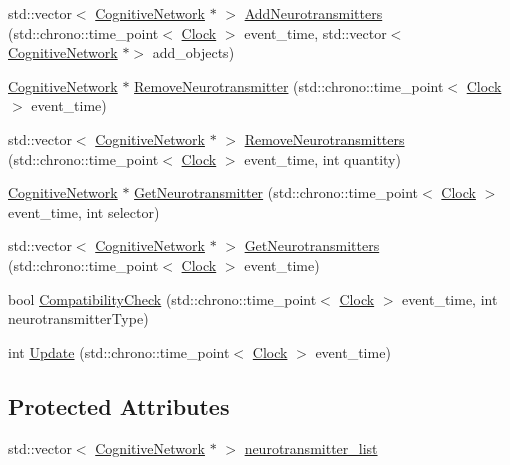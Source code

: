 \begin{DoxyCompactItemize}
\item 
std\+::vector$<$ \hyperlink{class_cognitive_network}{Cognitive\+Network} $\ast$ $>$ \hyperlink{class_membrane_channel_a01fb5f3176cfa3423bb10a04bf69da01}{Add\+Neurotransmitters} (std\+::chrono\+::time\+\_\+point$<$ \hyperlink{universe_8h_a0ef8d951d1ca5ab3cfaf7ab4c7a6fd80}{Clock} $>$ event\+\_\+time, std\+::vector$<$ \hyperlink{class_cognitive_network}{Cognitive\+Network} $\ast$$>$ add\+\_\+objects)
\item 
\hyperlink{class_cognitive_network}{Cognitive\+Network} $\ast$ \hyperlink{class_membrane_channel_a2252f222f4a41bf1975dc856569e0a22}{Remove\+Neurotransmitter} (std\+::chrono\+::time\+\_\+point$<$ \hyperlink{universe_8h_a0ef8d951d1ca5ab3cfaf7ab4c7a6fd80}{Clock} $>$ event\+\_\+time)
\item 
std\+::vector$<$ \hyperlink{class_cognitive_network}{Cognitive\+Network} $\ast$ $>$ \hyperlink{class_membrane_channel_a37f22ddd877e3be7b353048149a7bbcd}{Remove\+Neurotransmitters} (std\+::chrono\+::time\+\_\+point$<$ \hyperlink{universe_8h_a0ef8d951d1ca5ab3cfaf7ab4c7a6fd80}{Clock} $>$ event\+\_\+time, int quantity)
\item 
\hyperlink{class_cognitive_network}{Cognitive\+Network} $\ast$ \hyperlink{class_membrane_channel_a91ce6506a8e82905de7cd031ed5d63f5}{Get\+Neurotransmitter} (std\+::chrono\+::time\+\_\+point$<$ \hyperlink{universe_8h_a0ef8d951d1ca5ab3cfaf7ab4c7a6fd80}{Clock} $>$ event\+\_\+time, int selector)
\item 
std\+::vector$<$ \hyperlink{class_cognitive_network}{Cognitive\+Network} $\ast$ $>$ \hyperlink{class_membrane_channel_a9fdb20eb7d3f9ebad864d07aaa835716}{Get\+Neurotransmitters} (std\+::chrono\+::time\+\_\+point$<$ \hyperlink{universe_8h_a0ef8d951d1ca5ab3cfaf7ab4c7a6fd80}{Clock} $>$ event\+\_\+time)
\item 
bool \hyperlink{class_membrane_channel_a67496ca67ad3ecae38f6b987547b1b99}{Compatibility\+Check} (std\+::chrono\+::time\+\_\+point$<$ \hyperlink{universe_8h_a0ef8d951d1ca5ab3cfaf7ab4c7a6fd80}{Clock} $>$ event\+\_\+time, int neurotransmitter\+Type)
\item 
int \hyperlink{class_membrane_channel_a34077828eee1c2457212f05217b09d6c}{Update} (std\+::chrono\+::time\+\_\+point$<$ \hyperlink{universe_8h_a0ef8d951d1ca5ab3cfaf7ab4c7a6fd80}{Clock} $>$ event\+\_\+time)
\end{DoxyCompactItemize}
\subsection*{Protected Attributes}
\begin{DoxyCompactItemize}
\item 
std\+::vector$<$ \hyperlink{class_cognitive_network}{Cognitive\+Network} $\ast$ $>$ \hyperlink{class_membrane_channel_ad603f58813157b33ca81b919cf9c2897}{neurotransmitter\+\_\+list}
\end{DoxyCompactItemize}
